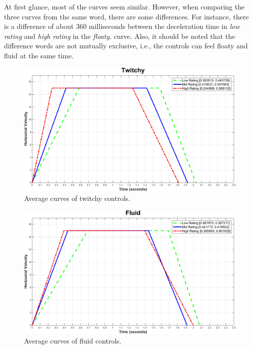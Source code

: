 At first glance, most of the curves seem similar. However, when comparing the three curves from the same word, there are some differences. For instance, there is a difference of about 360 milliseconds between the deceleration time in \textit{low rating} and \textit{high rating} in the \textit{floaty}. curve. Also, it should be noted that the difference words are not mutually exclusive, i.e., the controls can feel floaty and fluid at the same time.

\begin{figure}[htbp]
\centering
\includegraphics[width=\columnwidth]{Pics/Curves/Twitchy_curve}
\caption{Average curves of twitchy controls.}
\label{fig:curve_twitchy}
\end{figure}

\begin{figure}[htbp]
\centering
\includegraphics[width=\columnwidth]{Pics/Curves/Fluid_curve}
\caption{Average curves of fluid controls.}
\label{fig:curve_fluid}
\end{figure}

